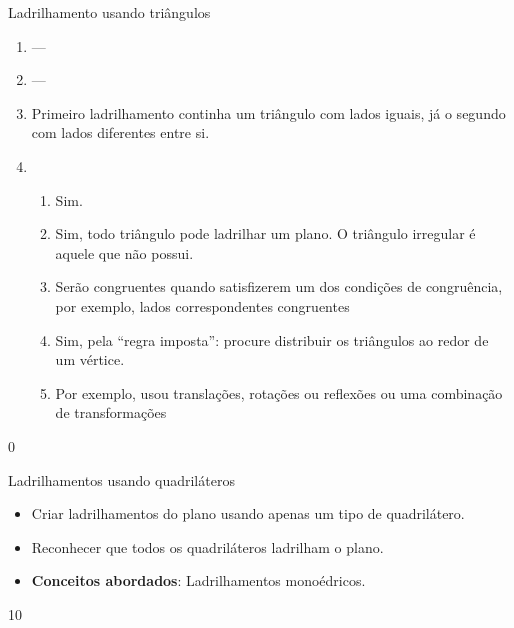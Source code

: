 \begin{answer}{Ladrilhamento usando triângulos}
{
	\begin{enumerate}
	\item ---
	\item ---
	\item Primeiro ladrilhamento continha um triângulo com lados iguais, já o segundo com lados diferentes entre si.
	\item 
	\begin{enumerate}
	    \item Sim.
		\item Sim, todo triângulo pode ladrilhar um plano. O triângulo irregular é aquele que não possui.
		\item Serão congruentes quando satisfizerem um dos condições de congruência, por exemplo, lados correspondentes congruentes
		\item Sim, pela “regra imposta”: procure distribuir os triângulos ao redor de um vértice.
		\item  Por exemplo,  usou translações, rotações ou reflexões ou uma combinação de transformações
	\end{enumerate}
	\end{enumerate}
}{0}
\end{answer}
\clearmargin
\begin{objectives}{Ladrilhamentos usando quadriláteros}
{\begin{itemize}
	\item Criar ladrilhamentos do plano usando apenas um tipo de quadrilátero.
	\item Reconhecer que todos os quadriláteros ladrilham o plano.
	\item \textbf{Conceitos abordados}: Ladrilhamentos monoédricos.
\end{itemize}
}{1}{0}
\end{objectives}

